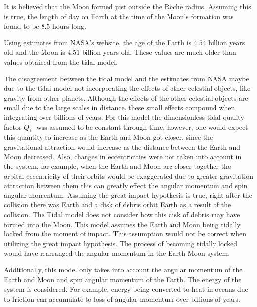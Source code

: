 \documentclass[12pt]{article}
\begin{document}
 It is believed that the Moon formed just outside the Roche radius. Assuming this is true, the length of day on Earth at the time of the Moon's formation was found to be $8.5$ hours long.
 
 Using estimates from NASA's website, the age of the Earth is $4.54$ billion years old and the Moon is $4.51$ billion years old. These values are much older than values obtained from the tidal model.
 
 The disagreement between the tidal model and the estimates from NASA maybe due to the tidal model not incorporating the effects of other celestial objects, like gravity from other planets. Although the effects of the other celestial objects are small due to the large scales in distance, these small effects compound when integrating over billions of years. For this model the dimensionless tidal quality factor $Q_{\leftmoon}$ was assumed to be constant through time, however, one would expect this quantity to increase as the Earth and Moon got closer, since the gravitational attraction would increase as the distance between the Earth and Moon decreased. Also, changes in eccentricities were not taken into account in the system, for example, when the Earth and Moon are closer together the orbital eccentricity of their orbits would be exaggerated due to greater gravitation attraction between them this can greatly effect the angular momentum and spin angular momentum. Assuming the great impact hypothesis is true, right after the collision there was Earth and a disk of debris orbit Earth as a result of the collision. The Tidal model does not consider how this disk of debris may have formed into the Moon. This model assumes the Earth and Moon being tidally locked from the moment of impact. This assumption would not be correct when utilizing the great impact hypothesis. The process of becoming tidally locked would have rearranged the angular momentum in the Earth-Moon system. 
 
 Additionally, this model only takes into account the angular momentum of the Earth and Moon and spin angular momentum of the Earth. The energy of the system is considered. For example, energy being converted to heat in oceans due to friction can accumulate to loss of angular momentum over billions of years. 
\end{document}
